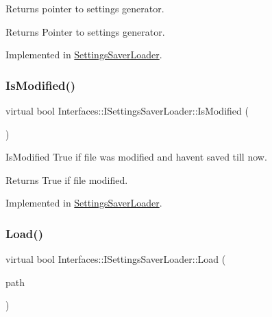 Returns pointer to settings generator. 

\begin{DoxyReturn}{Returns}
Pointer to settings generator. 
\end{DoxyReturn}


Implemented in \hyperlink{class_settings_saver_loader_aa6b0a9b4f42335b03341a13f8bfff845}{Settings\+Saver\+Loader}.

\mbox{\label{class_interfaces_1_1_i_settings_saver_loader_a4c3f69d0bc7c355030c8d371367108d3}} 
\subsubsection{\texorpdfstring{Is\+Modified()}{IsModified()}}
{\footnotesize\ttfamily virtual bool Interfaces\+::\+I\+Settings\+Saver\+Loader\+::\+Is\+Modified (\begin{DoxyParamCaption}{ }\end{DoxyParamCaption})\hspace{0.3cm}{\ttfamily [pure virtual]}}



Is\+Modified True if file was modified and haven\textquotesingle{}t saved till now. 

\begin{DoxyReturn}{Returns}
True if file modified. 
\end{DoxyReturn}


Implemented in \hyperlink{class_settings_saver_loader_a35574bdfc340a148245ea8017c59f2eb}{Settings\+Saver\+Loader}.

\mbox{\label{class_interfaces_1_1_i_settings_saver_loader_a4d8bdb2c5a27b5b0aa5ee4e55483f0de}} 
\subsubsection{\texorpdfstring{Load()}{Load()}}
{\footnotesize\ttfamily virtual bool Interfaces\+::\+I\+Settings\+Saver\+Loader\+::\+Load (\begin{DoxyParamCaption}\item[{Q\+String}]{path }\end{DoxyParamCaption})\hspace{0.3cm}{\ttfamily [pure virtual]}}



